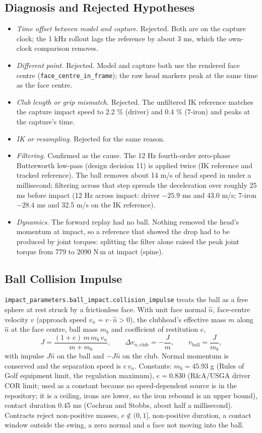 \documentclass[11pt,a4paper]{article}
\begin{document}
\subsection{Diagnosis and Rejected Hypotheses}
\begin{itemize}
\item \emph{Time offset between model and capture.} Rejected. Both are on the
capture clock; the 1 kHz rollout lags the reference by about 3 ms, which the
own-clock comparison removes.
\item \emph{Different point.} Rejected. Model and capture both use the rendered
face centre (\texttt{face\_centre\_in\_frame}); the raw head markers peak at
the same time as the face centre.
\item \emph{Club length or grip mismatch.} Rejected. The unfiltered IK
reference matches the capture impact speed to 2.2 \% (driver) and 0.4 \%
(7-iron) and peaks at the capture's time.
\item \emph{IK or resampling.} Rejected for the same reason.
\item \emph{Filtering.} Confirmed as the cause. The 12 Hz fourth-order
zero-phase Butterworth low-pass (design decision 11) is applied twice (IK
reference and tracked reference). The ball removes about 14 m/s of head speed
in under a millisecond; filtering across that step spreads the deceleration
over roughly 25 ms before impact (12 Hz across impact: driver $-25.9$ ms and
43.0 m/s; 7-iron $-28.4$ ms and 32.5 m/s on the IK reference).
\item \emph{Dynamics.} The forward replay had no ball. Nothing removed the
head's momentum at impact, so a reference that showed the drop had to be
produced by joint torques: splitting the filter alone raised the peak joint
torque from 779 to 2090 N\,m at impact (spine).
\end{itemize}

\subsection{Ball Collision Impulse}
\texttt{impact\_parameters.ball\_impact.collision\_impulse} treats the ball as
a free sphere at rest struck by a frictionless face. With unit face normal
$\hat n$, face-centre velocity $v$ (approach speed $v_n=v\cdot\hat n>0$), the
clubhead's effective mass $m$ along $\hat n$ at the face centre, ball mass
$m_b$ and coefficient of restitution $e$,
\[
J=\frac{(1+e)\,m\,m_b\,v_n}{m+m_b},\qquad
\Delta v_{n,\mathrm{club}}=-\frac{J}{m},\qquad v_\mathrm{ball}=\frac{J}{m_b},
\]
with impulse $J\hat n$ on the ball and $-J\hat n$ on the club. Normal
momentum is conserved and the separation speed is $e\,v_n$. Constants:
$m_b=45.93$ g (Rules of Golf equipment limit, the regulation maximum),
$e=0.830$ (R\&A/USGA driver COR limit; used as a constant because no
speed-dependent source is in the repository; it is a ceiling, irons are
lower, so the iron rebound is an upper bound), contact duration 0.45 ms
(Cochran and Stobbs, about half a millisecond). Contracts reject non-positive
masses, $e\notin(0,1]$, non-positive duration, a contact window outside the
swing, a zero normal and a face not moving into the ball.
\end{document}
